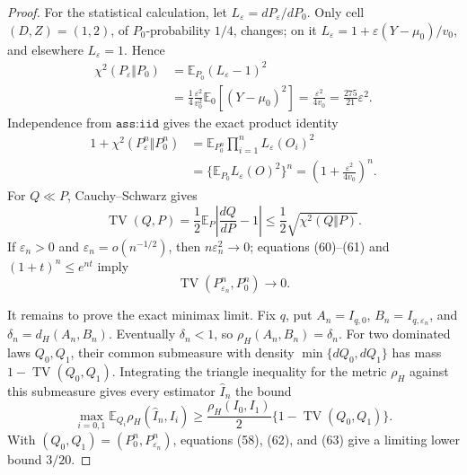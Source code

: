 \documentclass{article}
\begin{document}
\begin{proof}
For the statistical calculation, let \(L_\varepsilon=dP_\varepsilon/dP_0\).  Only cell \((D,Z)=(1,2)\), of \(P_0\)-probability \(1/4\), changes; on it
\(L_\varepsilon=1+\varepsilon(Y-\mu_0)/v_0\), and elsewhere \(L_\varepsilon=1\).  Hence
\[
 \begin{aligned}
 \chi^2(P_\varepsilon\Vert P_0)
 &=\mathbb E_{P_0}(L_\varepsilon-1)^2\\
 &=\frac14\frac{\varepsilon^2}{v_0^2}\mathbb E_0[(Y-\mu_0)^2]
 =\frac{\varepsilon^2}{4v_0}
 =\frac{275}{21}\varepsilon^2.                                               \tag{59}
 \end{aligned}
\]
Independence from \(\texttt{ass:iid}\) gives the exact product identity
\[
 \begin{aligned}
 1+\chi^2(P_\varepsilon^n\Vert P_0^n)
 &=\mathbb E_{P_0^n}\prod_{i=1}^nL_\varepsilon(O_i)^2\\
 &=\{\mathbb E_{P_0}L_\varepsilon(O)^2\}^n
 =\left(1+\frac{\varepsilon^2}{4v_0}\right)^n.                              \tag{60}
 \end{aligned}
\]
For \(Q\ll P\), Cauchy--Schwarz gives
\[
 \operatorname{TV}(Q,P)
 =\frac12\mathbb E_P\left|\frac{dQ}{dP}-1\right|
 \le\frac12\sqrt{\chi^2(Q\Vert P)}.                                        \tag{61}
\]
If \(\varepsilon_n>0\) and \(\varepsilon_n=o(n^{-1/2})\), then \(n\varepsilon_n^2\to0\); equations (60)--(61) and \((1+t)^n\le e^{nt}\) imply
\[
 \operatorname{TV}(P_{\varepsilon_n}^n,P_0^n)\longrightarrow0.               \tag{62}
\]

It remains to prove the exact minimax limit.  Fix \(q\), put \(A_n=I_{q,0}\), \(B_n=I_{q,\varepsilon_n}\), and \(\delta_n=d_H(A_n,B_n)\).  Eventually \(\delta_n<1\), so \(\rho_H(A_n,B_n)=\delta_n\).  For two dominated laws \(Q_0,Q_1\), their common submeasure with density \(\min\{dQ_0,dQ_1\}\) has mass \(1-\operatorname{TV}(Q_0,Q_1)\).  Integrating the triangle inequality for the metric \(\rho_H\) against this submeasure gives every estimator \(\widehat I_n\) the bound
\[
 \max_{i=0,1}\mathbb E_{Q_i}\rho_H(\widehat I_n,I_i)
 \ge\frac{\rho_H(I_0,I_1)}2
       \{1-\operatorname{TV}(Q_0,Q_1)\}.                                    \tag{63}
\]
With \((Q_0,Q_1)=(P_0^n,P_{\varepsilon_n}^n)\), equations (58), (62), and (63) give a limiting lower bound \(3/20\).


\end{proof}
\end{document}
